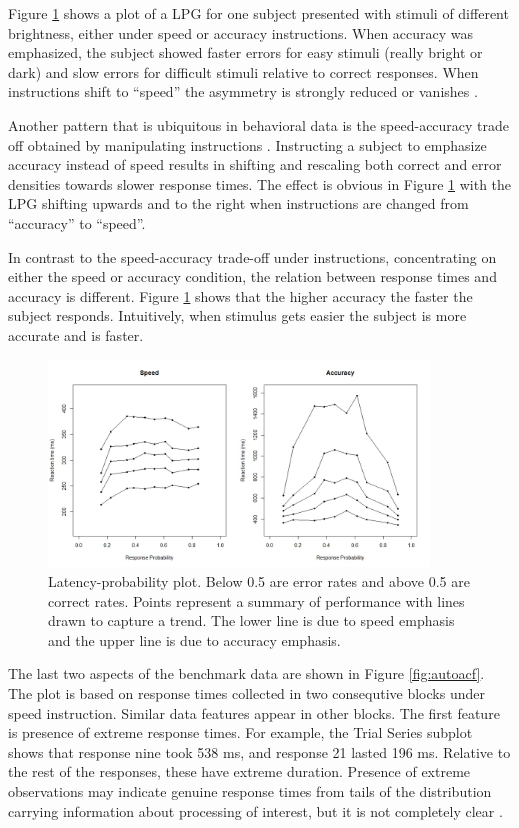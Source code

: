 \documentclass[12pt]{report}
\begin{document}
Figure \ref{fig:lpg} shows a plot of a LPG for one subject presented with stimuli of different brightness, either under speed or accuracy instructions. When accuracy was emphasized, the subject showed faster errors for easy stimuli (really bright or dark) and slow errors for difficult stimuli relative to correct responses. When instructions shift to ``speed'' the asymmetry is strongly reduced or vanishes \cite{Vic1979}.  

Another pattern that is ubiquitous in behavioral data is the speed-accuracy trade off obtained by manipulating instructions \citep{Vic1979, Luc1986, Hei2014}. Instructing a subject to emphasize accuracy instead of speed results in shifting and rescaling both correct and error densities towards slower response times. The effect is obvious in Figure \ref{fig:lpg} with the LPG shifting upwards and to the right when instructions are changed from ``accuracy'' to ``speed''. 

In contrast to the speed-accuracy trade-off under instructions, concentrating on either the speed or accuracy condition, the relation between response times and accuracy is different. Figure \ref{fig:lpg} shows that the higher accuracy the faster the subject responds. Intuitively, when stimulus gets easier the subject is more accurate and is faster.

\begin{figure}
\centering
\includegraphics[width=0.9\textwidth]{QP_RRdata}
\caption{Latency-probability plot. Below 0.5 are error rates and above 0.5 are correct rates. Points represent a summary of performance with lines drawn to capture a trend. The lower line is due to speed emphasis and the upper line is due to accuracy emphasis.}
\label{fig:lpg}
\end{figure}
%

The last two aspects of the benchmark data are shown in Figure \ref{fig:autoacf}. The plot is based on response times collected in two consequtive blocks under speed instruction. Similar data features appear in other blocks. The first feature is presence of extreme response times. For example, the Trial Series subplot shows that response nine took 538 ms, and response 21 lasted 196 ms. Relative to the rest of the responses, these have extreme duration. Presence of extreme observations may indicate genuine response times from tails of the distribution carrying information about processing of interest, but it is not completely clear \citep{CraPer2010}.
\end{document}
